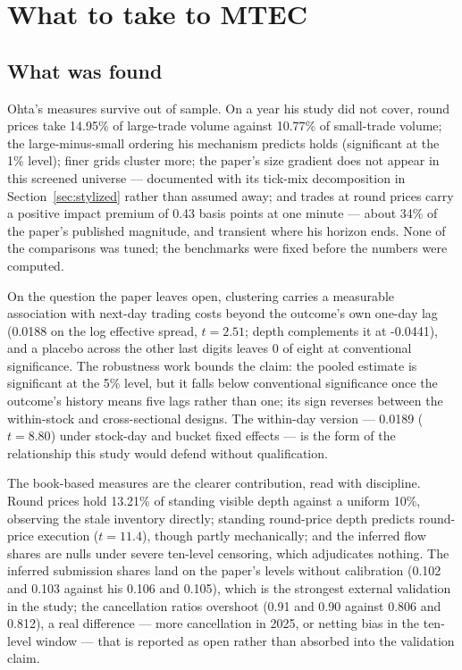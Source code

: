 
\section{What to take to MTEC}
\label{sec:discussion}

\subsection{What was found}

Ohta's measures survive out of sample. On a year his study did not cover, round prices take 14.95\% of large-trade volume against 10.77\% of small-trade volume; the large-minus-small ordering his mechanism predicts holds (significant at the 1\% level); finer grids cluster more; the paper's size gradient does not appear in this screened universe --- documented with its tick-mix decomposition in Section~\ref{sec:stylized} rather than assumed away; and trades at round prices carry a positive impact premium of 0.43 basis points at one minute --- about 34\% of the paper's published magnitude, and transient where his horizon ends. None of the comparisons was tuned; the benchmarks were fixed before the numbers were computed.

On the question the paper leaves open, clustering carries a measurable association with next-day trading costs beyond the outcome's own one-day lag (0.0188 on the log effective spread, $t=2.51$; depth complements it at -0.0441), and a placebo across the other last digits leaves 0 of eight at conventional significance. The robustness work bounds the claim: the pooled estimate is significant at the 5\% level, but it falls below conventional significance once the outcome's history means five lags rather than one; its sign reverses between the within-stock and cross-sectional designs. The within-day version --- 0.0189 ($t=8.80$) under stock-day and bucket fixed effects --- is the form of the relationship this study would defend without qualification.

The book-based measures are the clearer contribution, read with discipline. Round prices hold 13.21\% of standing visible depth against a uniform 10\%, observing the stale inventory directly; standing round-price depth predicts round-price execution ($t=11.4$), though partly mechanically; and the inferred flow shares are nulls under severe ten-level censoring, which adjudicates nothing. The inferred submission shares land on the paper's levels without calibration (0.102 and 0.103 against his 0.106 and 0.105), which is the strongest external validation in the study; the cancellation ratios overshoot (0.91 and 0.90 against 0.806 and 0.812), a real difference --- more cancellation in 2025, or netting bias in the ten-level window --- that is reported as open rather than absorbed into the validation claim.


